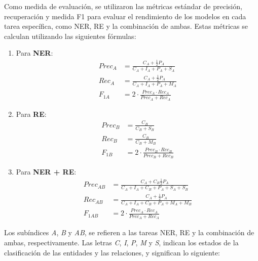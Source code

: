 \documentclass[10pt]{article} %
\begin{document}
	Como medida de evaluaci\'on, se utilizaron las métricas estándar de precisión, recuperación y medida F1 para evaluar el rendimiento de los modelos en cada tarea específica, como NER, RE y la combinación de ambas. Estas métricas se calculan utilizando las siguientes fórmulas:
	
	\begin{enumerate}
		\item Para \textbf{NER}:		
			\begin{align}				
				Prec_A &= \frac{C_A + \frac{1}{2}P_A}{C_A + I_A + P_A + S_A}\\				
				Rec_A &= \frac{C_A + \frac{1}{2}P_A}{C_A + I_A + P_A + M_A}\\				
				F_{1A} &= 2 \cdot \frac{Prec_A \cdot Rec_A}{Prec_A + Rec_A}			
			\end{align}
		 \item Para \textbf{RE}:		
		\begin{align}				
			Prec_B &= \frac{C_B}{C_B + S_B}\\				
			Rec_B &= \frac{C_B}{C_B + M_B}\\				
			F_{1B} &= 2 \cdot \frac{Prec_B \cdot Rec_B}{Prec_B + Rec_B}			
		\end{align}
		\item Para \textbf{NER + RE}:		
		\begin{align}				
			Prec_{AB} &= \frac{C_A + C_B \frac{1}{2}P_A}{C_A + I_A + C_B + P_A + S_A + S_B}\\						
			Rec_{AB} &= \frac{C_A + \frac{1}{2}P_A}{C_A + I_A + C_B + P_A + M_A + M_B}\\						
			F_{1AB} &= 2 \cdot \frac{Prec_A \cdot Rec_A}{Prec_A + Rec_A}			
		\end{align}		
		
	\end{enumerate}

	Los sub\'indices \textit{A}, \textit{B} y \textit{AB}, se refieren a las tareas NER, RE y la combinaci\'on de ambas, respectivamente. Las letras \textit{C}, \textit{I}, \textit{P}, \textit{M} y \textit{S}, indican los estados de la clasificaci\'on de las entidades y las relaciones, y significan lo siguiente:
	
\end{document}
